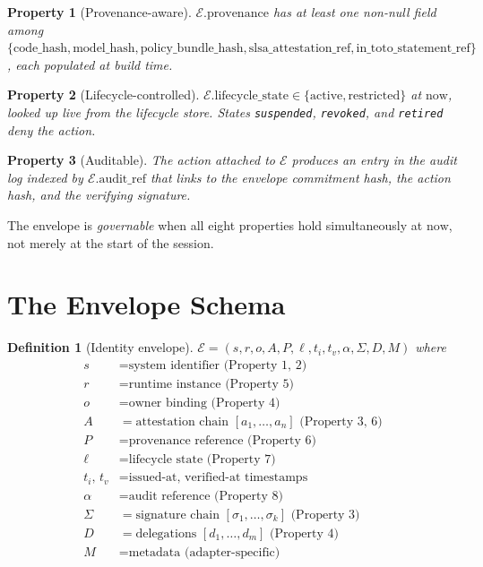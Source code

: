 \documentclass[11pt,a4paper]{article}
\newtheorem{property}{Property}
\newtheorem{definition}{Definition}
\begin{document}
\begin{property}[Provenance-aware]
$\mathcal{E}.\text{provenance}$ has at least one non-null field among
$\{\text{code\_hash}, \text{model\_hash}, \text{policy\_bundle\_hash},
\text{slsa\_attestation\_ref}, \text{in\_toto\_statement\_ref}\}$,
each populated at build time.
\end{property}

\begin{property}[Lifecycle-controlled]
$\mathcal{E}.\text{lifecycle\_state} \in \{\text{active},
\text{restricted}\}$ at $\mathrm{now}$, looked up live from the lifecycle
store. States \texttt{suspended}, \texttt{revoked}, and \texttt{retired}
deny the action.
\end{property}

\begin{property}[Auditable]
The action attached to $\mathcal{E}$ produces an entry in the audit log
indexed by $\mathcal{E}.\text{audit\_ref}$ that links to the envelope
commitment hash, the action hash, and the verifying signature.
\end{property}

The envelope is \emph{governable} when all eight properties hold
simultaneously at $\mathrm{now}$, not merely at the start of the session.

\section{The Envelope Schema}\label{sec:schema}

\begin{definition}[Identity envelope]
$\mathcal{E} = (s, r, o, A, P, \ell, t_i, t_v, \alpha, \Sigma, D, M)$
where
\begin{align*}
s &= \text{system identifier (Property 1, 2)} \\
r &= \text{runtime instance (Property 5)} \\
o &= \text{owner binding (Property 4)} \\
A &= \text{attestation chain $[a_1, \ldots, a_n]$ (Property 3, 6)} \\
P &= \text{provenance reference (Property 6)} \\
\ell &= \text{lifecycle state (Property 7)} \\
t_i,\, t_v &= \text{issued-at, verified-at timestamps} \\
\alpha &= \text{audit reference (Property 8)} \\
\Sigma &= \text{signature chain $[\sigma_1, \ldots, \sigma_k]$ (Property 3)} \\
D &= \text{delegations $[d_1, \ldots, d_m]$ (Property 4)} \\
M &= \text{metadata (adapter-specific)}
\end{align*}
\end{definition}
\end{document}
